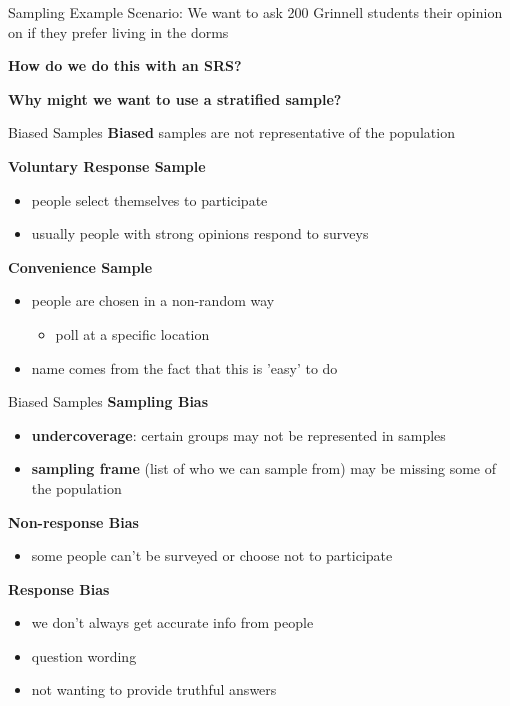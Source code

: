 \documentclass{beamer}
\begin{document}
\begin{frame}{Sampling Example}
Scenario: We want to ask 200 Grinnell students their opinion on if they prefer living in the dorms \vspace{8mm}

\textbf{How do we do this with an SRS?} \vspace{8mm}

\textbf{Why might we want to use a stratified sample?}

\end{frame}



\begin{frame}{Biased Samples}
\textbf{Biased} samples are not representative of the population \vspace{4mm}

\textbf{Voluntary Response Sample}
\begin{itemize}
    \item people select themselves to participate
    \item usually people with strong opinions respond to surveys
\end{itemize} \vspace{4mm}

\textbf{Convenience Sample}
\begin{itemize}
    \item people are chosen in a non-random way
        \begin{itemize}
            \item poll at a specific location
        \end{itemize}
    \item name comes from the fact that this is 'easy' to do
\end{itemize}
\end{frame}



\begin{frame}{Biased Samples}
\textbf{Sampling Bias}
\begin{itemize}
    \item \textbf{undercoverage}: certain groups may not be represented in samples
    \item \textbf{sampling frame} (list of who we can sample from) may be missing some of the population
\end{itemize} \vspace{4mm}

\textbf{Non-response Bias}
\begin{itemize}
    \item some people can't be surveyed or choose not to participate
\end{itemize} \vspace{4mm}

\textbf{Response Bias}
\begin{itemize}
    \item we don't always get accurate info from people
    \item question wording
    \item not wanting to provide truthful answers
\end{itemize}
\end{frame}
\end{document}
